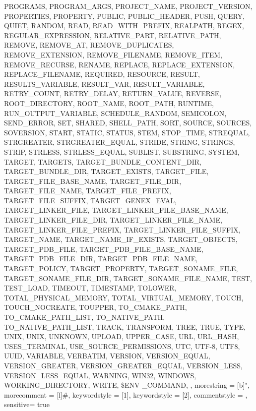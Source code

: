 {{    PROGRAMS,
    PROGRAM_ARGS,
    PROJECT_NAME,
    PROJECT_VERSION,
    PROPERTIES,
    PROPERTY,
    PUBLIC,
    PUBLIC_HEADER,
    PUSH,
    QUERY,
    QUIET,
    RANDOM,
    READ,
    READ_WITH_PREFIX,
    REALPATH,
    REGEX,
    REGULAR_EXPRESSION,
    RELATIVE_PART,
    RELATIVE_PATH,
    REMOVE,
    REMOVE_AT,
    REMOVE_DUPLICATES,
    REMOVE_EXTENSION,
    REMOVE_FILENAME,
    REMOVE_ITEM,
    REMOVE_RECURSE,
    RENAME,
    REPLACE,
    REPLACE_EXTENSION,
    REPLACE_FILENAME,
    REQUIRED,
    RESOURCE,
    RESULT,
    RESULTS_VARIABLE,
    RESULT_VAR,
    RESULT_VARIABLE,
    RETRY_COUNT,
    RETRY_DELAY,
    RETURN_VALUE,
    REVERSE,
    ROOT_DIRECTORY,
    ROOT_NAME,
    ROOT_PATH,
    RUNTIME,
    RUN_OUTPUT_VARIABLE,
    SCHEDULE_RANDOM,
    SEMICOLON,
    SEND_ERROR,
    SET,
    SHARED,
    SHELL_PATH,
    SORT,
    SOURCE,
    SOURCES,
    SOVERSION,
    START,
    STATIC,
    STATUS,
    STEM,
    STOP_TIME,
    STREQUAL,
    STRGREATER,
    STRGREATER_EQUAL,
    STRIDE,
    STRING,
    STRINGS,
    STRIP,
    STRLESS,
    STRLESS_EQUAL,
    SUBLIST,
    SUBSTRING,
    SYSTEM,
    TARGET,
    TARGETS,
    TARGET_BUNDLE_CONTENT_DIR,
    TARGET_BUNDLE_DIR,
    TARGET_EXISTS,
    TARGET_FILE,
    TARGET_FILE_BASE_NAME,
    TARGET_FILE_DIR,
    TARGET_FILE_NAME,
    TARGET_FILE_PREFIX,
    TARGET_FILE_SUFFIX,
    TARGET_GENEX_EVAL,
    TARGET_LINKER_FILE,
    TARGET_LINKER_FILE_BASE_NAME,
    TARGET_LINKER_FILE_DIR,
    TARGET_LINKER_FILE_NAME,
    TARGET_LINKER_FILE_PREFIX,
    TARGET_LINKER_FILE_SUFFIX,
    TARGET_NAME,
    TARGET_NAME_IF_EXISTS,
    TARGET_OBJECTS,
    TARGET_PDB_FILE,
    TARGET_PDB_FILE_BASE_NAME,
    TARGET_PDB_FILE_DIR,
    TARGET_PDB_FILE_NAME,
    TARGET_POLICY,
    TARGET_PROPERTY,
    TARGET_SONAME_FILE,
    TARGET_SONAME_FILE_DIR,
    TARGET_SONAME_FILE_NAME,
    TEST,
    TEST_LOAD,
    TIMEOUT,
    TIMESTAMP,
    TOLOWER,
    TOTAL_PHYSICAL_MEMORY,
    TOTAL_VIRTUAL_MEMORY,
    TOUCH,
    TOUCH_NOCREATE,
    TOUPPER,
    TO_CMAKE_PATH,
    TO_CMAKE_PATH_LIST,
    TO_NATIVE_PATH,
    TO_NATIVE_PATH_LIST,
    TRACK,
    TRANSFORM,
    TREE,
    TRUE,
    TYPE,
    UNIX,
    UNIX,
    UNKNOWN,
    UPLOAD,
    UPPER_CASE,
    URL,
    URL_HASH,
    USES_TERMINAL,
    USE_SOURCE_PERMISSIONS,
    UTC,
    UTF-8,
    UTF8,
    UUID,
    VARIABLE,
    VERBATIM,
    VERSION,
    VERSION_EQUAL,
    VERSION_GREATER,
    VERSION_GREATER_EQUAL,
    VERSION_LESS,
    VERSION_LESS_EQUAL,
    WARNING,
    WIN32,
    WINDOWS,
    WORKING_DIRECTORY,
    WRITE,
    \$ENV
    _COMMAND,
    },
  morestring = [b]",
  morecomment = [l]\#,
  keywordstyle = [1]\color{blue},
  keywordstyle = [2]\color{darkblue},
  commentstyle = \color{comment-green},
  sensitive= true
}

